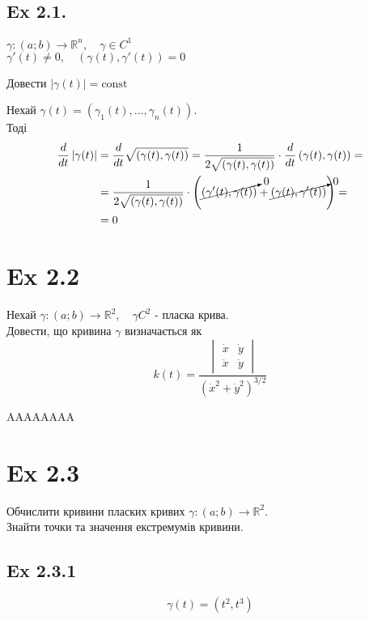 \documentclass[10pt, a4paper]{article} %
\newcommand{\R}{\mathbb{R}}
\begin{document}
\subsection*{Ex 2.1.}
\begin{mdframed}
    $\gamma : (a;b) \to \R^n, \quad \gamma \in C^1$\\
    $\gamma'(t) \ne 0, \quad \left(\gamma(t), \gamma'(t)\right) = 0$

    Довести
    $\left|\gamma(t)\right| = \text{const}$
\end{mdframed}

Нехай $\gamma(t) = (\gamma_1(t), ..., \gamma_n(t))$.\\
Тоді
\begin{align*}
    \frac{d}{dt} \left|\gamma(t)\right| &= \frac{d}{dt} \sqrt{\left(\gamma(t), \gamma(t)\right)} = 
    \frac{1}{2\sqrt{\left(\gamma(t), \gamma(t)\right)}} \cdot \frac{d}{dt}\left(\gamma(t), \gamma(t)\right) = \\
    &= \frac{1}{2\sqrt{\left(\gamma(t), \gamma(t)\right)}} \cdot \left(\cancelto{0}{(\gamma'(t), \gamma(t))} + \cancelto{0}{(\gamma(t), \gamma'(t))}\right) = \\
    &= 0
\end{align*}


\section*{Ex 2.2}
\begin{mdframed}
    Нехай $\gamma : (a;b) \to \R^2, \quad \gamma C^2$ - пласка крива.\\
    Довести, що кривина $\gamma$ визначається як 
    \[k(t) = \frac{\begin{vmatrix}
        \dot x & \dot y \\ \ddot x & \ddot y
    \end{vmatrix}}{(\dot x^2 + \dot y^2)^{3/2}}\]
\end{mdframed}

AAAAAAAA

\section*{Ex 2.3}
\begin{mdframed}
    Обчислити кривини пласких кривих $\gamma: (a;b) \to \R^2$.\\
    Знайти точки та значення екстремумів кривини.
\end{mdframed}

\subsection*{Ex 2.3.1}
\[\gamma(t) = (t^2, t^3)\]
\end{document}
